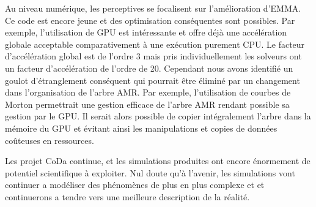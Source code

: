 Au niveau numérique, les perceptives se focalisent sur l'amélioration d'EMMA. 
Ce code est encore jeune et des optimisation conséquentes sont possibles.
Par exemple, l'utilisation de GPU est intéressante et offre déjà une accélération globale acceptable comparativement à une exécution purement CPU.
Le facteur d'accélération global est de l'ordre 3 mais pris individuellement les solveurs ont un facteur d'accélération de l'ordre de 20.
Cependant nous avons identifié un goulot d'étranglement conséquent qui pourrait être éliminé par un changement dans l'organisation de l'arbre AMR.
Par exemple, l'utilisation de courbes de Morton permettrait une gestion efficace de l'arbre AMR rendant possible sa gestion par le GPU.
Il serait alors possible de copier intégralement l'arbre dans la mémoire du GPU et évitant ainsi les manipulations et copies de données coûteuses en ressources.

Les projet CoDa continue, et les simulations produites ont encore énormement de potentiel scientifique à exploiter.
Nul doute qu'à l'avenir, les simulations vont continuer a modéliser des phénomènes de plus en plus complexe et et continuerons a tendre vers une meilleure description de la réalité.







%



